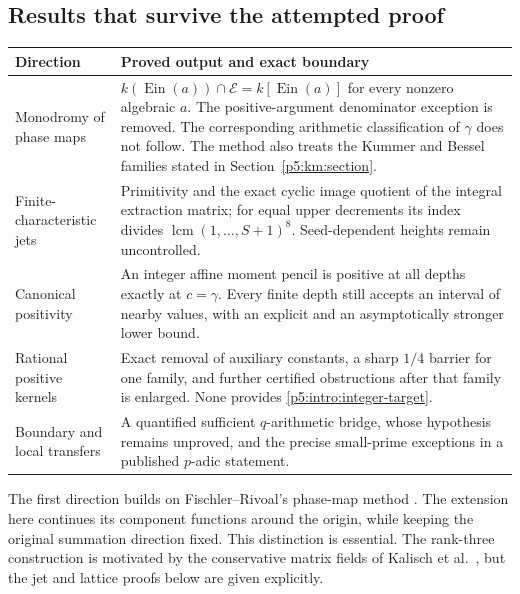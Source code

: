 \documentclass[11pt,a4paper]{article}
\theoremstyle{definition}
\theoremstyle{remark}
\DeclareMathOperator{\lcm}{lcm}
\numberwithin{equation}{section}
\begin{document}
\subsection{Results that survive the attempted proof}
\begin{center}
\small
\begin{tabular}{>{\raggedright\arraybackslash}p{}>{\raggedright\arraybackslash}p{}}
\toprule
Direction & Proved output and exact boundary\\
\midrule
Monodromy of phase maps &
$k(\operatorname{Ein}(a))\cap\mathcal E=k[\operatorname{Ein}(a)]$
for every nonzero algebraic $a$. The positive-argument denominator
exception is removed. The corresponding arithmetic classification
of $\gamma$ does not follow. The method also treats the Kummer and
Bessel families stated in Section~\ref{p5:km:section}.\\[4pt]
Finite-characteristic jets &
Primitivity and the exact cyclic image quotient of the integral
extraction matrix; for equal upper decrements its index divides
$\lcm(1,\ldots,S+1)^8$. Seed-dependent heights remain uncontrolled.\\[4pt]
Canonical positivity &
An integer affine moment pencil is positive at all depths exactly at
$c=\gamma$. Every finite depth still accepts an interval of nearby
values, with an explicit and an asymptotically stronger lower bound.\\[4pt]
Rational positive kernels &
Exact removal of auxiliary constants, a sharp $1/4$ barrier for one
family, and further certified obstructions after that family is
enlarged. None provides \eqref{p5:intro:integer-target}.\\[4pt]
Boundary and local transfers &
A quantified sufficient $q$-arithmetic bridge, whose hypothesis
remains unproved, and the precise small-prime exceptions in a
published $p$-adic statement.\\
\bottomrule
\end{tabular}
\end{center}

The first direction builds on Fischler--Rivoal's phase-map method
\cite{p5:FischlerRivoal2026Units}. The extension here continues its
component functions around the origin, while keeping the original
summation direction fixed. This distinction is essential. The
rank-three construction is motivated by the conservative matrix
fields of Kalisch et al.\ \cite{p5:Kalisch2026}, but the jet and lattice
proofs below are given explicitly.
\end{document}
